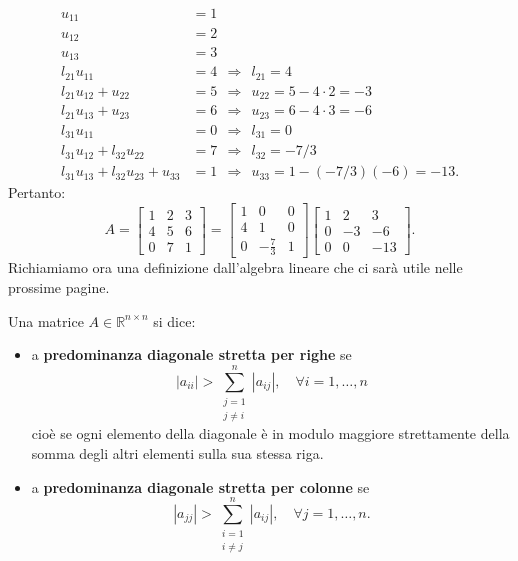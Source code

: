 \begin{align*}
u_{11} & =1\\
u_{12} & =2\\
u_{13} & =3\\
l_{21} u_{11} & =4\ \ \Rightarrow \ \ l_{21} =4\\
l_{21} u_{12} +u_{22} & =5\ \ \Rightarrow \ \ u_{22} =5-4\cdot 2=-3\\
l_{21} u_{13} +u_{23} & =6\ \ \Rightarrow \ \ u_{23} =6-4\cdot 3=-6\\
l_{31} u_{11} & =0\ \ \Rightarrow \ \ l_{31} =0\\
l_{31} u_{12} +l_{32} u_{22} & =7\ \ \Rightarrow \ \ l_{32} =-7/3\\
l_{31} u_{13} +l_{32} u_{23} +u_{33} & =1\ \ \Rightarrow \ \ u_{33} =1-( -7/3)( -6) =-13.
\end{align*}
Pertanto:
\begin{equation*}
A=\begin{bmatrix}
1 & 2 & 3\\
4 & 5 & 6\\
0 & 7 & 1
\end{bmatrix} =\begin{bmatrix}
1 & 0 & 0\\
4 & 1 & 0\\
0 & -\frac{7}{3} & 1
\end{bmatrix}\begin{bmatrix}
1 & 2 & 3\\
0 & -3 & -6\\
0 & 0 & -13
\end{bmatrix}.
\end{equation*}
Richiamiamo ora una definizione dall'algebra lineare che ci sarà utile nelle prossime pagine.
\begin{definition}
  Una matrice $A\in \mathbb{R} ^{n\times n} $ si dice:
  \begin{itemize}
      \item a \textbf{predominanza diagonale stretta per righe} se
      \begin{equation*}
          |a_{ii} | >\sum ^{n}_{\substack{j=1\\j\neq i}} |a_{ij} |,\quad \forall i=1,\dotsc ,n
      \end{equation*}
      cioè se ogni elemento della diagonale è in modulo maggiore strettamente della somma degli altri elementi sulla sua stessa riga.
      \item a \textbf{predominanza diagonale stretta per colonne} se
      \begin{equation*}
          |a_{jj} | >\sum ^{n}_{\substack{i=1\\i\neq j}} |a_{ij} |,\quad \forall j=1,\dotsc ,n.
      \end{equation*}
  \end{itemize}
\end{definition}

